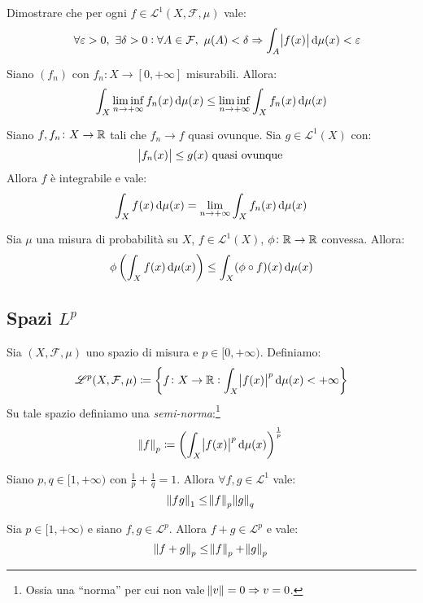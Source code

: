 \begin{exercise}
    Dimostrare che per ogni $ f \in \mathscr{L}^1(X,\mathcal{F},\mu) $ vale:
    \[ \quad \forall\epsilon > 0, \ \exists \delta > 0 : \forall A\in\mathcal{F}, \ \mu(A) < \delta \Rightarrow \int_A \abs{f(x)} \dif\mu(x) < \epsilon \]
\end{exercise}
\begin{exercise}
    Siano $ (f_n) $ con $ f_n\colon X\to[0,+\infty] $ misurabili. Allora:
    \[ \int_X \liminf_{n\to +\infty}f_n(x)\dif\mu(x) \leq \liminf_{n\to +\infty} \int_X f_n(x)\dif\mu(x) \]
\end{exercise}
\begin{exercise} \label{thm:convergenza-dominata}
    Siano $ f, f_n\colon X\to\mathbb{R} $ tali che $ f_n\to f $ quasi ovunque. Sia $ g\in\mathscr{L}^1(X) $ con:
    \[ \abs{f_n(x)} \leq g(x) \text{ quasi ovunque} \]
    Allora $ f $ è integrabile e vale:
    \[ \int_X f(x)\dif\mu(x) = \lim_{n\to +\infty}\int_X f_n(x)\dif\mu(x) \]
\end{exercise}
\begin{exercise}
    Sia $ \mu $ una misura di probabilità su $ X $, $ f\in\mathscr{L}^1(X) $, $ \phi\colon \mathbb{R}\to\mathbb{R} $ convessa. Allora:
    \[ \phi\left(\int_X f(x)\dif\mu(x) \right) \leq \int_X (\phi\circ f)(x)\dif\mu(x) \]
\end{exercise}
\subsection{Spazi $ L^p $}
\begin{definition}
    Sia $ (X,\mathcal{F},\mu) $ uno spazio di misura e $ p\in[0,+\infty) $. Definiamo:
    \[ \mathscr{L}^p(X,\mathcal{F},\mu) \coloneqq \left\{ f\colon X\to \R : \int_X \abs{f(x)}^p \dif\mu(x) < +\infty \right\}  \]
    Su tale spazio definiamo una \emph{semi-norma}:\footnote{Ossia una ``norma'' per cui non vale $ \norm{v} = 0 \Rightarrow v=0 $.}
    \[ \norm{f}_p \coloneqq \left( \int_X \abs{f(x)}^p\dif\mu(x) \right)^{\frac{1}{p}} \]
\end{definition}
\begin{exercise}
    Siano $ p, q \in [1,+\infty) $ con $ \frac{1}{p} + \frac{1}{q} = 1 $. Allora $ \forall f,g \in \mathscr{L}^1 $ vale:
    \[ \norm{fg}_{1} \leq \norm{f}_p\norm{g}_q \]
\end{exercise}
\begin{exercise}
    Sia $ p\in[1,+\infty) $ e siano $ f,g \in\mathscr{L}^p$. Allora $ f+g \in\mathscr{L}^p $ e vale:
    \[ \norm{f+g}_p \leq \norm{f}_p + \norm{g}_p \]
\end{exercise}

